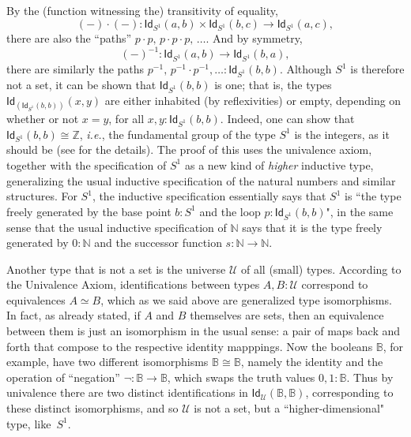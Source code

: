 \documentclass[11pt]{article}
\newcommand{\B}{\ensuremath{\mathbb{B}}}
\newcommand{\N}{\ensuremath{\mathbb{N}}}
\newcommand{\Id}{\mathsf{Id}}
\newcommand{\id}[1]{\Id_{#1}}
\newcommand{\U}{\ensuremath{\mathcal{U}}}
\begin{document}
By the (function witnessing the) transitivity of equality, 
\[
(-)\cdot(-) : \id{S^1}(a,b) \times \id{S^1}(b,c)\to \id{S^1}(a,c),
\]
 there are also the ``paths'' $p\cdot p,\, p\cdot p\cdot p,\, \ldots$.   And by symmetry,
 \[
 (-)^{-1}:\id{S^1}(a,b) \to \id{S^1}(b,a),
 \]
 there are similarly the paths $p^{-1},\, p^{-1}\cdot p^{-1}, \ldots :\id{S^1}(b,b)$.  Although $S^1$ is therefore not a set, it can be shown that $\id{S^1}(b,b)$ is one; that is, the types $\id{\left(\id{S^1}(b,b)\right)}(x,y)$ are either inhabited (by reflexivities) or empty, depending on whether or not $x=y$, for all $x,y : \id{S^1}(b,b)$.  Indeed, one can show that $\id{S^1}(b,b) \cong \mathbb{Z}$, \textit{i.e.}, the fundamental group of the type $S^1$ is the integers, as it should be (see \cite{LS-Circ} for the details).  
The proof of this uses the univalence axiom, together with the specification of $S^1$ as a new kind of \emph{higher} inductive type, generalizing the usual inductive specification of the natural numbers and similar structures.  For $S^1$, the inductive specification essentially says that $S^1$ is ``the type freely generated by the base point $b:S^1$ and the loop $p:\id{S^1}(b,b)$", in the same sense that the usual inductive specification of $\N$ says that it is the type freely generated by $0:\N$ and the successor function $s:\N\to\N$.  
  
Another type that is not a set is the universe $\U$ of all (small) types.  According to the Univalence Axiom, identifications between types $A,B:\U$ correspond to equivalences $A\simeq B$, which as we said above are generalized type isomorphisms.  In fact, as already stated, if $A$ and $B$ themselves are sets, then an equivalence between them is just an isomorphism in the usual sense: a pair of maps back and forth that compose to the respective identity mapppings.  Now the booleans $\B$, for example, have two different isomorphisms $\B\cong \B$, namely the identity and the operation of ``negation'' $\neg:\B\to\B$, which swaps the truth values $0,1:\B$.  Thus by univalence there are two distinct identifications in $\id{\U}(\B,\B)$, corresponding to these distinct isomorphisms, and so $\U$ is not a set, but a ``higher-dimensional" type, like~$S^1$.  
 
\end{document}

